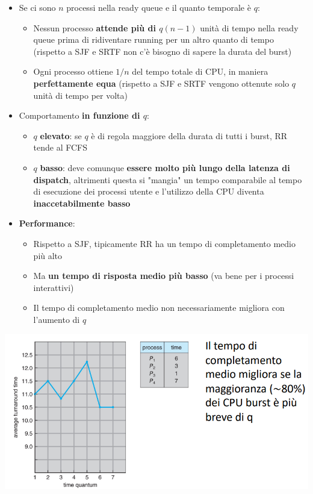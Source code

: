 \documentclass[12pt]{article}
\begin{document}
\begin{itemize}
    \item Se ci sono $n$ processi nella ready queue e il quanto temporale è $q$:
    \begin{itemize}
        \item Nessun processo \textbf{attende più di $q(n-1)$} unità di tempo nella ready queue prima di ridiventare running per un altro quanto di tempo (rispetto a SJF e SRTF non c'è bisogno di sapere la durata del burst)
        \item Ogni processo ottiene $1/n$ del tempo totale di CPU, in maniera \textbf{perfettamente equa} (rispetto a SJF e SRTF vengono ottenute solo $q$ unità di tempo per volta)
    \end{itemize}
    \item Comportamento \textbf{in funzione di $q$}:
    \begin{itemize}
        \item $q$ \textbf{elevato}: se $q$ è di regola maggiore della durata di tutti i burst, RR tende al FCFS
        \item $q$ \textbf{basso}: deve comunque \textbf{essere molto più lungo della latenza di dispatch}, altrimenti questa si "mangia" un tempo comparabile al tempo di esecuzione dei processi utente e l'utilizzo della CPU diventa \textbf{inaccetabilmente basso}
    \end{itemize}
    \item \textbf{Performance}:
    \begin{itemize}
        \item Rispetto a SJF, tipicamente RR ha un tempo di completamento medio più alto
        \item Ma \textbf{un tempo di risposta medio più basso} (va bene per i processi interattivi)
        \item Il tempo di completamento medio non necessariamente migliora con l'aumento di $q$
    \end{itemize}
\end{itemize}
\begin{center}
    \includegraphics[width = 0.90\linewidth]{Images/48.png}
\end{center}
\end{document}

